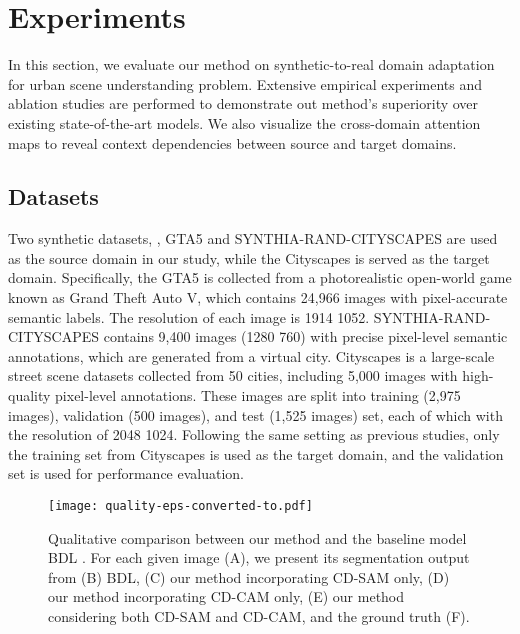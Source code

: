 \documentclass[10pt,twocolumn,letterpaper]{article}
\begin{document}
	\section{Experiments}

	In this section, we evaluate our method on synthetic-to-real domain adaptation for urban scene understanding problem. Extensive empirical experiments and ablation studies are performed to demonstrate out method's superiority over existing state-of-the-art models.
	We also visualize the cross-domain attention maps to reveal context dependencies between source and target domains.

	\subsection{Datasets}

	Two synthetic datasets, \ie, GTA5 \cite{richter2016playing} and SYNTHIA-RAND-CITYSCAPES \cite{ros2016synthia} are used as the source domain in our study, while the Cityscapes \cite{cordts2016cityscapes} is served as the target domain. Specifically, the GTA5 is collected from a photorealistic open-world game known as Grand Theft Auto V, which contains 24,966 images with pixel-accurate semantic labels. The resolution of each image is 1914  1052. SYNTHIA-RAND-CITYSCAPES contains 9,400 images (1280  760) with precise pixel-level semantic annotations, which are generated from a virtual city. Cityscapes is a large-scale street scene datasets collected from 50 cities, including 5,000 images with high-quality pixel-level annotations. These images are split into training (2,975 images), validation (500 images), and test (1,525 images) set, each of which with the resolution of 2048  1024. Following the same setting as previous studies, only the training set from Cityscapes is used as the target domain, and the validation set is used for performance evaluation.

	\begin{figure*}
		\begin{center}
\texttt{[image: quality-eps-converted-to.pdf]}
		\end{center}
		\caption{Qualitative comparison between our method and the baseline model BDL \cite{li2019bidirectional}. For each given image (A), we present its segmentation output from (B) BDL, (C) our method incorporating CD-SAM only, (D) our method incorporating CD-CAM only, (E) our method considering both CD-SAM and CD-CAM, and the ground truth (F).}
		\label{fig:quality}
		\vspace{-0.2in}
	\end{figure*}
\end{document}
